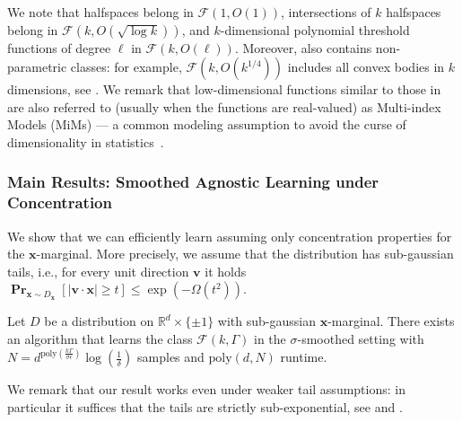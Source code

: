 \documentclass{theoretics}
\renewcommand\vec[1]{\mathbf{#1}}
\DeclareMathOperator*{\pr}{\mathbf{Pr}}
\newcommand{\R}{\mathbb{R}}
\newcommand{\poly}{\mathrm{poly}}
\newcommand{\D}{D}
\newcommand{\1}{\Ind}
\newcommand{\x}{\vec x}
\begin{document}
We note that halfspaces belong in $\mathcal F(1, O(1))$, intersections of $k$ halfspaces belong in $ \mathcal F(k, O(\sqrt{\log k}))$, %
and $k$-dimensional polynomial threshold functions of degree $\ell$ in $\mathcal F(k, O(\ell))$.
Moreover,  also contains non-parametric classes: 
for example, $\mathcal F(k, O(k^{1/4}))$ includes all convex bodies in $k$ dimensions,
see .
We remark that low-dimensional functions similar to those in  are also referred to (usually when the functions are real-valued) as Multi-index Models (MiMs) ---  a common modeling assumption to avoid the curse of dimensionality in statistics~\cite{Friedman:1980tu, Huber85-pp, Li91, HL93,xia2002adaptive, Xia08}.



\subsubsection{Main Results: Smoothed Agnostic Learning under Concentration}

We show that we can efficiently learn assuming only concentration properties for the $\x$-marginal.  More precisely, we assume that the distribution has 
sub-gaussian tails, i.e., for every unit direction $\vec v$ it holds $\pr_{\x \sim \D_\x}[|\vec v \cdot \x| \geq t] \leq \exp(-\Omega(t^2))$. 
\begin{theorem}
\label{thm:intro-subgaussian}
    Let $D$ be a distribution on $\R^{d}\times \{\pm 1\}$ with sub-gaussian $\x$-marginal.
    There exists an algorithm that learns the class $\mathcal F(k, \Gamma)$ in 
    the $\sigma$-smoothed setting with 
    $N = d^{\poly(\frac{k\Gamma}{\sigma\epsilon})}\log(\frac{1}{\delta}) $ samples and $\poly(d,N)$ runtime.
\end{theorem}
We remark that our result works even under weaker tail assumptions: in particular it suffices that the tails are strictly sub-exponential, see  and .  
\end{document}
